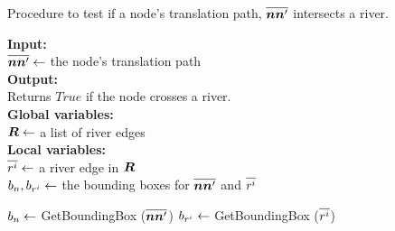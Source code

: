 \begin{algorithm}[tb!]
    \caption{Procedure to test if a node's translation path, $ \protect\overline{\bm{n}\bm{n}'} $ intersects a river.}\label{alg:check river intersection}
    \textbf{Input:} \\
    $ \protect\overline{\bm{n}\bm{n}'} \gets $ the node's translation path \\

    \textbf{Output:} \\
    Returns $ True $ if the node crosses a river. \\

    \textbf{Global variables:} \\
    $ \bm{R} \gets $ a list of river edges \\

    \textbf{Local variables:} \\
    $ \protect\overline{r^i} \gets $ a river edge in $ \bm{R} $ \\ 
    $ b_n, b_{r^i} \gets $ the bounding boxes for $ \protect\overline{\bm{n}\bm{n}'} $ and $ \protect\overline{r^i} $ \\

    \begin{algorithmic}[1]
        
        \ForEach{$ \riverEdgeListEachLine \in \riverEdgeList $}
            \State $ b_n \gets $ GetBoundingBox ($ \protect\overline{\bm{n}\bm{n}'} $)
            \State $ b_{r^i} \gets $ GetBoundingBox ($ \protect\overline{r^i} $)

                \State {}
                \EndIf
        \EndFor
        
        \State {}
        \EndProcedure
    \end{algorithmic}
\end{algorithm}

